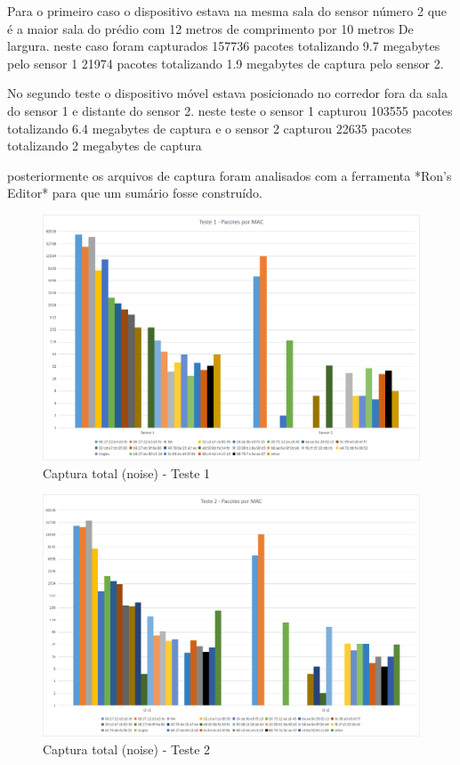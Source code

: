 Para o primeiro caso o dispositivo estava na mesma sala do sensor número 2 que é a maior
sala do prédio com 12  metros de comprimento por 10 metros  De largura. neste caso foram
capturados 157736 pacotes totalizando 9.7 megabytes pelo sensor 1 21974 pacotes totalizando
1.9 megabytes de captura pelo sensor 2.

No segundo teste o dispositivo móvel estava posicionado no corredor fora da sala do sensor 1
e distante do sensor 2.  neste teste o sensor 1 capturou 103555 pacotes totalizando 6.4 megabytes
de captura e o sensor 2 capturou 22635 pacotes totalizando 2 megabytes de captura

 posteriormente os arquivos de captura foram analisados com a ferramenta *Ron’s Editor*  para que um sumário fosse construído.


\begin{figure}[htb]
	\caption{\label{fig:modulos-esp}Captura total (noise) - Teste 1}
	\begin{center}
		\includegraphics[width=1\textwidth]{060-testes/data-analisis/distance-mg4plus-netflix/Teste1.png}
	\end{center}
\end{figure}

\begin{figure}[htb]
	\caption{\label{fig:modulos-esp}Captura total (noise) - Teste 2}
	\begin{center}
		\includegraphics[width=1\textwidth]{060-testes/data-analisis/distance-mg4plus-netflix/Teste2.png}
	\end{center}
\end{figure}


